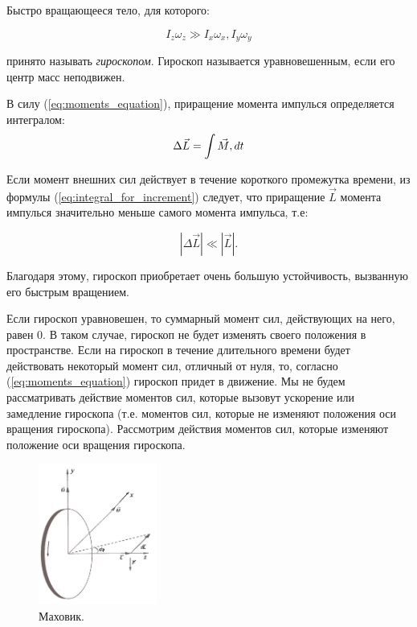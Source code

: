 \documentclass[a4paper,12pt]{article}
\begin{document}
Быстро вращающееся тело, для которого:

	$$I_{z}\omega_{z} \gg I_{x}\omega_{x}, I_{y}\omega_{y}$$

принято называть \textit{гироскопом}. Гироскоп называется уравновешенным, если его центр масс неподвижен.

В силу (\ref{eq:moments_equation}), приращение момента импулься определяется интегралом:
\begin{equation}
	\Delta\vec{L} =  \int\vec{M}\\,dt
	\label{eq:integral_for_increment}
\end{equation}

Если момент внешних сил действует в течение короткого промежутка времени, из формулы (\ref{eq:integral_for_increment}) следует, что приращение $\vec{L}$ момента импулься значительно меньше самого момента импульса, т.е:

\begin{equation}
	\left| \Delta\vec{L} \right| \ll \left| \vec{L} \right|.
\end{equation}

Благодаря этому, гироскоп приобретает очень большую устойчивость, вызванную его быстрым вращением.

Если гироскоп уравновешен, то суммарный момент сил, действующих на него, равен 0. В таком случае, гироскоп не будет изменять своего положения в пространстве. Если на гироскоп в течение длительного времени будет действовать некоторый момент сил, отличный от нуля, то, согласно (\ref{eq:moments_equation}) гироскоп придет в движение. Мы не будем рассматривать действие моментов сил, которые вызовут ускорение или замедление гироскопа (т.е. моментов сил, которые не изменяют положения оси вращения гироскопа). Рассмотрим действия моментов сил, которые изменяют положение оси вращения гироскопа.

\begin{figure}
	\vspace{-2.5ex}
	\includegraphics[width = 0.35\textwidth]{flywheel}
	\caption{Маховик.}
	\label{fig:flywheel}
\end{figure}
\end{document}
